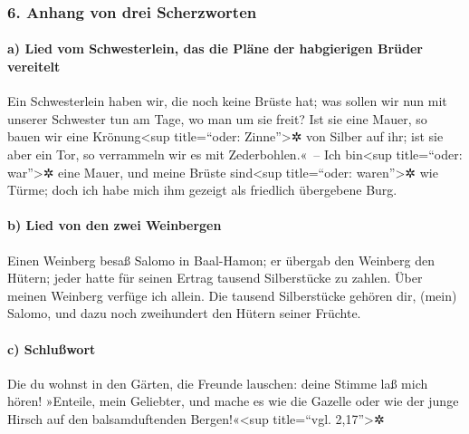 \hypertarget{anhang-von-drei-scherzworten}{%
\subsubsection{6. Anhang von drei
Scherzworten}\label{anhang-von-drei-scherzworten}}

\hypertarget{a-lied-vom-schwesterlein-das-die-pluxe4ne-der-habgierigen-bruxfcder-vereitelt}{%
\paragraph{a) Lied vom Schwesterlein, das die Pläne der habgierigen
Brüder
vereitelt}\label{a-lied-vom-schwesterlein-das-die-pluxe4ne-der-habgierigen-bruxfcder-vereitelt}}

Ein Schwesterlein haben wir, die noch keine Brüste hat;
was sollen wir nun mit unserer Schwester tun am Tage, wo man um sie
freit? Ist sie eine Mauer, so bauen wir eine
Krönung\textless sup title=``oder: Zinne''\textgreater✲ von Silber auf
ihr; ist sie aber ein Tor, so verrammeln wir es mit Zederbohlen.«~--
Ich bin\textless sup title=``oder: war''\textgreater✲
eine Mauer, und meine Brüste sind\textless sup title=``oder:
waren''\textgreater✲ wie Türme; doch ich habe mich ihm gezeigt als
friedlich übergebene Burg.

\hypertarget{b-lied-von-den-zwei-weinbergen}{%
\paragraph{b) Lied von den zwei
Weinbergen}\label{b-lied-von-den-zwei-weinbergen}}

Einen Weinberg besaß Salomo in Baal-Hamon; er übergab den
Weinberg den Hütern; jeder hatte für seinen Ertrag tausend Silberstücke
zu zahlen. Über meinen Weinberg verfüge ich allein. Die
tausend Silberstücke gehören dir, (mein) Salomo, und dazu noch
zweihundert den Hütern seiner Früchte.

\hypertarget{c-schluuxdfwort}{%
\paragraph{c) Schlußwort}\label{c-schluuxdfwort}}

Die du wohnst in den Gärten, die Freunde lauschen: deine
Stimme laß mich hören! »Enteile, mein Geliebter, und
mache es wie die Gazelle oder wie der junge Hirsch auf den
balsamduftenden Bergen!«\textless sup title=``vgl. 2,17''\textgreater✲
